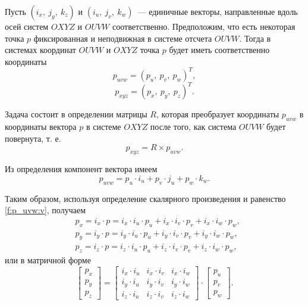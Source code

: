 \documentclass[oneside, final, 14pt]{extarticle}
\begin{document}
Пусть \((i_x,\:j_y,\:k_z)\) и \((i_u,\:j_v,\:k_w)\)~--- единичные векторы, направленные вдоль осей систем \(OXYZ\) и \(OUVW\) соответственно.
Предположим, что есть некоторая точка \(p\) фиксированная и неподвижная в системе отсчета \(OUVW\).
Тогда в системах координат \(OUVW\) и \(OXYZ\) точка \(p\) будет иметь соответственно координаты~\cite{fu:rob_tech}
\begin{equation}\label{f:p_uvw:c}
  p_{uvw} = (p_u,\:p_v,\:p_w)^T
  ,
\end{equation}
\begin{equation}\label{f:p_xyz:c}
  p_{xyz} = (p_x,\:p_y,\:p_z)^T
  .
\end{equation}
\par
Задача состоит в определении матрицы \(R\), которая преобразует координаты \(p_{uvw}\) в координаты вектора \(p\) в системе \(OXYZ\) после того, как система \(OUVW\) будет повернута, т. е.
\begin{equation}\label{f:p_xyz:ouvw:sh}
  p_{xyz} = R\times p_{uvw}
  .
\end{equation}
\par
Из определения компонент вектора имеем 
\begin{equation}\label{f:p_uvw:v}
  p_{uvw} = p_u \cdot i_u + p_v \cdot j_u + p_w \cdot k_w
  .
\end{equation}
\par
Таким образом, используя определение скалярного произведения и равенство \ref{f:p_uvw:v}, получаем 
\begin{equation}\label{f:p_xyz:ouvw}
  \begin{aligned}
  & p_x = i_x \cdot p =  i_x \cdot i_u \cdot p_u + i_x \cdot i_v \cdot p_v + i_x \cdot i_w \cdot p_w,\\
  & p_y = i_y \cdot p =  i_y \cdot i_u \cdot p_u + i_y \cdot i_v \cdot p_v + i_y \cdot i_w \cdot p_w,\\
  & p_z = i_z \cdot p =  i_z \cdot i_u \cdot p_u + i_z \cdot i_v \cdot p_v + i_z \cdot i_w \cdot p_w,
  \end{aligned}
\end{equation}
или в матричной форме
\begin{equation}\label{f:p_xyz:ouvw:m}
  \begin{bmatrix}
  p_x\\
  p_y\\
  p_z
  \end{bmatrix}
  =
  \begin{bmatrix}
  i_x \cdot i_u & i_x \cdot i_v & i_x \cdot i_w\\
  i_y \cdot i_u & i_y \cdot i_v & i_y \cdot i_w\\
  i_z \cdot i_u & i_z \cdot i_v & i_z \cdot i_w
  \end{bmatrix}
  \cdot
\begin{bmatrix}
  p_u\\
  p_v\\
  p_w
  \end{bmatrix}
  .
\end{equation}
\end{document}
